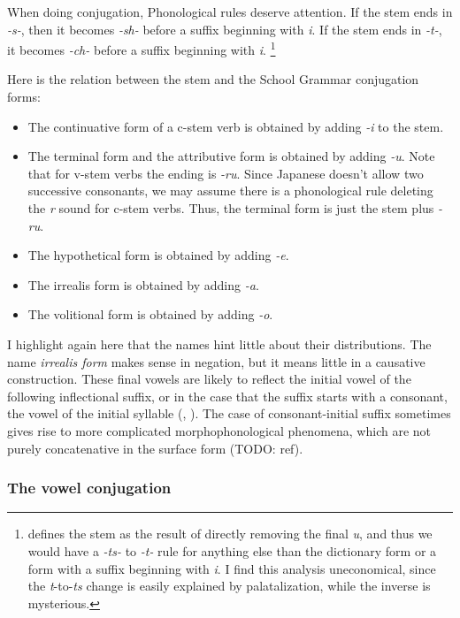 \documentclass[UTF8, a4paper, oneside, scheme=plain]{ctexart}
\newcommand*{\term}[1]{\emph{#1}}
\newcommand{\corpus}[1]{\emph{#1}}
\begin{document}
When doing conjugation, Phonological rules deserve attention.
If the stem ends in \corpus{-s-}, 
then it becomes \corpus{-sh-} before a suffix beginning with \corpus{i}.
If the stem ends in \corpus{-t-},
it becomes \corpus{-ch-} before a suffix beginning with \corpus{i}.%
\footnote{
    \citet{akiyama2012japanese} defines the stem as the result of directly removing the final \corpus{u},
    and thus we would have a \corpus{-ts-} to \corpus{-t-} rule 
    for anything else than the dictionary form or a form with a suffix beginning with \corpus{i}.
    I find this analysis uneconomical,
    since the \corpus{t}-to-\corpus{ts} change is easily explained by palatalization,
    while the inverse is mysterious.
}

Here is the relation between the stem and the School Grammar conjugation forms:
\begin{itemize}
    \item The continuative form of a c-stem verb is obtained by adding \corpus{-i} to the stem.
    \item The terminal form and the attributive form is obtained by adding \corpus{-u}.
    Note that for v-stem verbs the ending is \corpus{-ru}.
    Since Japanese doesn't allow two successive consonants,
    we may assume there is a phonological rule deleting the \corpus{r} sound for c-stem verbs.
    Thus, the terminal form is just the stem plus \corpus{-ru}.
    \item The hypothetical form is obtained by adding \corpus{-e}.
    \item The irrealis form is obtained by adding \corpus{-a}.
    \item The volitional form is obtained by adding \corpus{-o}.
\end{itemize}
I highlight again here that the names hint little about their distributions.
The name \term{irrealis form} makes sense in negation,
but it means little in a causative construction.
These final vowels are likely to reflect 
the initial vowel of the following inflectional suffix,
or in the case that the suffix starts with a consonant,
the vowel of the initial syllable
(, ).
The case of consonant-initial suffix sometimes gives rise to more complicated morphophonological phenomena,
which are not purely concatenative in the surface form (TODO: ref). 

\subsubsection{The vowel conjugation}\label{sec:vowel-class}
\end{document}
